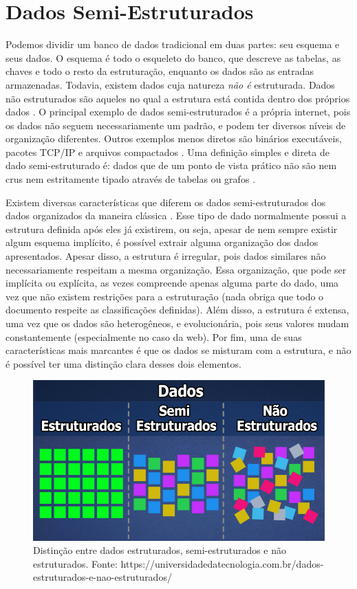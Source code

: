 \section{Dados Semi-Estruturados}

Podemos dividir um banco de dados tradicional em duas partes: seu esquema e seus dados. O esquema é todo o esqueleto do banco, que descreve as tabelas, as chaves e todo o resto da estruturação, enquanto os dados são as entradas armazenadas. Todavia, existem dados cuja natureza \textit{não é} estruturada. Dados não estruturados são aqueles no qual a estrutura está contida dentro dos próprios dados \cite{buneman1997semistructured}. O principal exemplo de dados semi-estruturados é a própria internet, pois os dados não seguem necessariamente um padrão, e podem ter diversos níveis de organização diferentes. Outros exemplos menos diretos são binários executáveis, pacotes TCP/IP e arquivos compactados \cite{geeks}.
Uma definição simples e direta de dado semi-estruturado é: dados que de um ponto de vista prático não são nem crus nem estritamente tipado através de tabelas ou grafos \cite{abiteboul1997querying}.

Existem diversas características que diferem os dados semi-estruturados dos dados organizados da maneira clássica \cite{dosdados}. Esse tipo de dado normalmente possui a estrutura definida após eles já existirem, ou seja, apesar de nem sempre existir algum esquema implícito, é possível extrair alguma organização dos dados apresentados. Apesar disso, a estrutura é irregular, pois dados similares não necessariamente respeitam a mesma organização. Essa organização, que pode ser implícita ou explícita, as vezes compreende apenas alguma parte do dado, uma vez que não existem restrições para a estruturação (nada obriga que todo o documento respeite as classificações definidas). Além disso, a estrutura é extensa, uma vez que os dados são heterogêneos, e evolucionária, pois seus valores mudam constantemente (especialmente no caso da web). Por fim, uma de suas características mais marcantes é que os dados se misturam com a estrutura, e não é possível ter uma distinção clara desses dois elementos. 

\begin{figure}[t]
    \centering
    \includegraphics[width=\textwidth]{imagens/tipos.jpg}
    \caption{Distinção entre dados estruturados, semi-estruturados e não estruturados. Fonte: https://universidadedatecnologia.com.br/dados-estruturados-e-nao-estruturados/}
    \label{fig:dados}
\end{figure}

